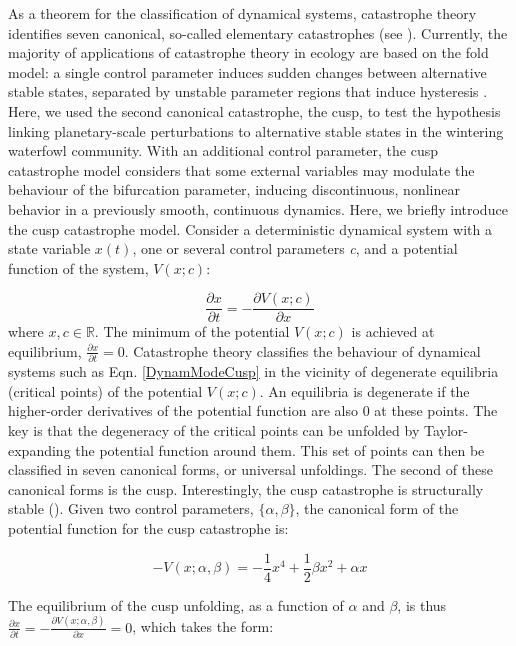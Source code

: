 \documentclass[11pt]{article}
\newcommand{\R}{\mathbb{R}}
\begin{document}
{As a theorem for the classification of dynamical systems, catastrophe theory identifies seven canonical, so-called elementary catastrophes (see \cite{Thom1975,Arnold1994}). Currently, the majority of applications of catastrophe theory in ecology are based on the fold model: a single control parameter induces sudden changes between alternative stable states, separated by unstable parameter regions that induce hysteresis \cite{Dakos2019,Scheffer2009a}. Here, we used the second canonical catastrophe, the cusp, to test the hypothesis linking planetary-scale perturbations to alternative stable states in the wintering waterfowl community. With an additional control parameter, the cusp catastrophe model considers that some external variables may modulate the behaviour of the bifurcation parameter, inducing discontinuous, nonlinear behavior in a previously smooth, continuous dynamics. Here, we briefly introduce the cusp catastrophe model. Consider a deterministic dynamical system with a state variable $ x(t) $, one or several control parameters \textit{c}, and a potential function of the system, $ V(x; c) $:

\begin{equation}\label{DynamModeCusp}
	\frac{\partial x}{\partial t} = - \frac{\partial V(x; c)}{\partial x}
\end{equation}
where $x, c \in \R$. The minimum of the potential $ V(x; c) $ is achieved at equilibrium, $ \frac{\partial x}{\partial t} = 0 $. Catastrophe theory classifies the behaviour of dynamical systems such as Eqn. \ref{DynamModeCusp} in the vicinity of degenerate equilibria (critical points) of the potential $ V(x; c) $. An equilibria is degenerate if the higher-order derivatives of the potential function are also 0 at these points. The key is that the degeneracy of the critical points can be unfolded by Taylor-expanding the potential function around them. This set of points can then be classified in seven canonical forms, or universal unfoldings. The second of these canonical forms is the cusp. Interestingly, the cusp catastrophe is structurally stable (\cite{Poston1979}). Given two control parameters, $ \{\alpha, \beta\} $, the canonical form of the potential function for the cusp catastrophe is:

\begin{equation}\label{CanonicalPotential}
	-V(x; \alpha, \beta) =  - \frac{1}{4} x^4 + \frac{1}{2}\beta x^2 + \alpha x 
\end{equation}

The equilibrium of the cusp unfolding, as a function of $ \alpha $ and $ \beta $, is thus $ \frac{\partial x}{\partial t} = - \frac{\partial V(x; \alpha,\beta)}{\partial x} = 0$, which takes the form:

}
\end{document}
